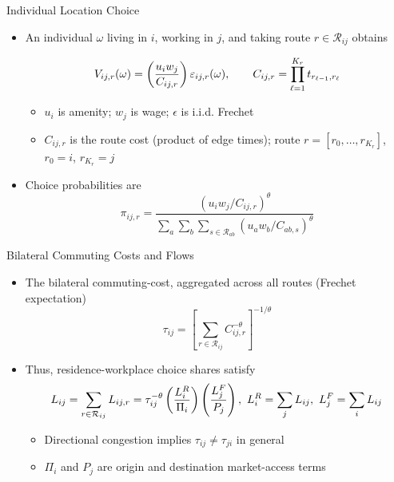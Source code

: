 \documentclass[11pt,aspectratio=169]{beamer}
\newcommand{\R}{\mathcal{R}}
\begin{document}
\begin{frame}{Individual Location Choice}
\begin{itemize}
  \item An individual $\omega$ living in $i$, working in $j$, and taking route $r\in\R_{ij}$ obtains
  \vspace{-0.5em}\begin{footnotesize}\begin{equation}
    V_{ij,r}(\omega) = \left( \frac{u_i w_j}{C_{ij,r}} \right)\varepsilon_{ij,r}(\omega),
    \qquad
    C_{ij,r} = \prod_{\ell=1}^{K_r} t_{r_{\ell-1},r_\ell}
  \vspace{-1.25em}\end{equation}\end{footnotesize}
  \begin{itemize}
    \item $u_i$ is amenity; $w_j$ is wage; $\epsilon$ is i.i.d. Frechet
    \item $C_{ij,r}$ is the route cost (product of edge times); route $r=[r_0,\dots,r_{K_r}]$, $r_0=i$, $r_{K_r}=j$
  \end{itemize}
  \vspace{0.5em}
  \item Choice probabilities are
  \vspace{-0.5em}\begin{equation}\label{eq:pi}
    \pi_{ij,r} = \frac{\left(u_i w_j/C_{ij,r}\right)^\theta}{\sum_{a}\sum_b\sum_{s\in\R_{ab}}\left(u_a w_b/C_{ab,s}\right)^\theta}
  \end{equation}
\end{itemize}
\end{frame}

\begin{frame}{Bilateral Commuting Costs and Flows}
\begin{itemize}
  \item The bilateral commuting-cost, aggregated across all routes (Frechet expectation)
  \vspace{-0.5em}\begin{equation}
    \tau_{ij} = \left[ \sum_{r\in\R_{ij}} C_{ij,r}^{-\theta} \right]^{-1/\theta}
  \end{equation}
  \item Thus, residence-workplace choice shares satisfy
  \vspace{-0.25em}\begin{equation}\label{eq:gravity}
    L_{ij} = \sum_{r\in\R_{ij}}L_{ij,r} = \tau_{ij}^{-\theta} \left(\frac{L_i^R}{\Pi_i}\right) \left(\frac{L_j^F}{P_j}\right), \,\, L_i^R=\sum_jL_{ij}, \,\, L_j^F=\sum_iL_{ij}
  \vspace{-1em}\end{equation}
  \begin{itemize}
    \item Directional congestion implies $\tau_{ij}\neq\tau_{ji}$ in general
    \item $\Pi_i$ and $P_j$ are origin and destination market-access terms
  \end{itemize}
\end{itemize}
\end{frame}
\end{document}
